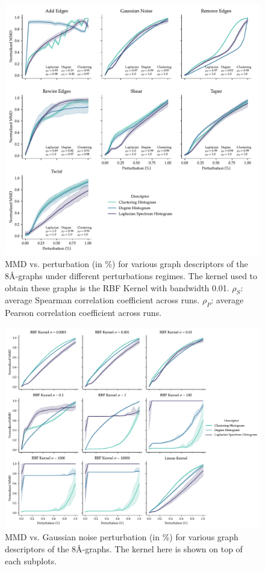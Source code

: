 \begin{figure}
  \centering
  \includegraphics[width=\textwidth]{./figures/results/res_1_1.pdf}
  \caption{MMD vs. perturbation (in \%) for various graph descriptors of the 8\si{\angstrom}-graphs under different perturbations regimes. The kernel
    used to obtain these graphs is the RBF Kernel with bandwidth 0.01.
    $\rho_{S}$: average Spearman correlation coefficient across runs.
    $\rho_{P}$: average Pearson correlation coefficient across runs.}
  \label{fig:mmd_consistent_eps}
\end{figure}


\begin{figure}
  \centering
  \includegraphics[width=\textwidth]{./figures/results/res_1_2.pdf}
  \caption{MMD vs. Gaussian noise perturbation (in \%) for various graph descriptors of the
    8\si{\angstrom}-graphs. The kernel here is shown on top of each subplots.}
  \label{fig:mmd_effect_kernel}
\end{figure}

